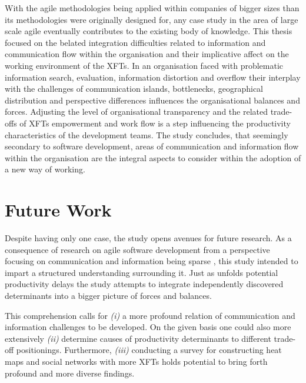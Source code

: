 With the agile methodologies being applied within companies of bigger sizes than its methodologies were originally designed for, any case study in the area of large scale agile eventually contributes to the existing body of knowledge. This thesis focused on the belated integration difficulties related to information and communication flow within the organisation and their implicative affect on the working environment of the \acp{XFT}. In an organisation faced with problematic information search, evaluation, information distortion and overflow their interplay with the challenges of communication islands, bottlenecks, geographical distribution and perspective differences influences the organisational balances and forces. Adjusting the level of organisational transparency and the related trade-offs of \acp{XFT} empowerment and work flow is a step influencing the productivity characteristics of the development teams. The study concludes, that seemingly secondary to software development, areas of communication and information flow within the organisation are the integral aspects to consider within the adoption of a new way of working.

\section{Future Work}

Despite having only one case, the study opens avenues for future research.
As a consequence of research on agile software development from a perspective focusing on communication and information being sparse \citep{pikkarainen2008impactagilecommunication}, this study intended to impart a structured understanding surrounding it. Just as \citet{badampudi2013proddelay} unfolds potential productivity delays the study attempts to integrate independently discovered determinants into a bigger picture of forces and balances.

This comprehension calls for \emph{(i)} a more profound relation of communication and information challenges to be developed. On the given basis one could also more extensively \emph{(ii)} determine causes of productivity determinants to different trade-off positionings. Furthermore, \emph{(iii)} conducting a survey for constructing heat maps and social networks with more \acp{XFT} holds potential to bring forth profound and more diverse findings. 